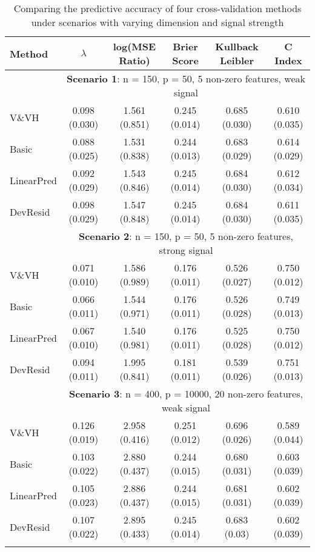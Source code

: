 \begin{table}[!htb]

\setlength{\tabcolsep}{3pt}

\caption{\label{Tab:sim} Comparing the predictive accuracy of four cross-validation methods under scenarios with varying dimension and signal strength}
\centering
\begin{tabular}[t]{lccccc}
\toprule
 Method & $\lambda$ & log(MSE Ratio) &Brier Score & Kullback Leibler & C Index\\
\midrule
&\multicolumn{5}{c}{\textbf{Scenario 1}: n = 150, p = 50, 5 non-zero features, weak signal}\\
\cline{2-6}
V\&VH  & 0.098 (0.030) & 1.561 (0.851) & 0.245 (0.014) & 0.685 (0.030) & 0.610 (0.035) \\
Basic  & 0.088 (0.025) & 1.531 (0.838) & 0.244 (0.013) & 0.683 (0.029) & 0.614 (0.029) \\
LinearPred  & 0.092 (0.029) & 1.543 (0.846) & 0.245 (0.014) & 0.684 (0.030) & 0.612 (0.034) \\
DevResid  & 0.098 (0.029) & 1.547 (0.848) & 0.245 (0.014) & 0.684 (0.030) & 0.611 (0.035) \\
\addlinespace
&\multicolumn{5}{c}{\textbf{Scenario 2}: n = 150, p = 50, 5 non-zero features, strong signal}\\
\cline{2-6}
V\&VH  & 0.071 (0.010) & 1.586 (0.989) & 0.176 (0.011) & 0.526 (0.027) & 0.750 (0.012) \\
Basic  & 0.066 (0.011) & 1.544 (0.971) & 0.176 (0.011) & 0.526 (0.028) & 0.749 (0.013) \\
LinearPred  & 0.067 (0.010) & 1.540 (0.981) & 0.176 (0.011) & 0.525 (0.028) & 0.750 (0.012) \\
DevResid  & 0.094 (0.011) & 1.995 (0.841) & 0.181 (0.011) & 0.539 (0.026) & 0.751 (0.013) \\
\addlinespace
&\multicolumn{5}{c}{\textbf{Scenario 3}: n = 400, p = 10000, 20 non-zero features, weak signal}\\
\cline{2-6}
V\&VH  & 0.126 (0.019) & 2.958 (0.416) & 0.251 (0.012) & 0.696 (0.026) & 0.589 (0.044) \\
Basic  & 0.103 (0.022) & 2.880 (0.437) & 0.244 (0.015) & 0.680 (0.031) & 0.603 (0.039) \\
LinearPred  & 0.105 (0.023) & 2.886 (0.437) & 0.244 (0.015) & 0.681 (0.031) & 0.602 (0.039) \\
DevResid  & 0.107 (0.022) & 2.895 (0.433) & 0.245 (0.014) & 0.683 (0.03) & 0.602 (0.039) \\
\addlinespace

\end{tabular}
\end{table}
